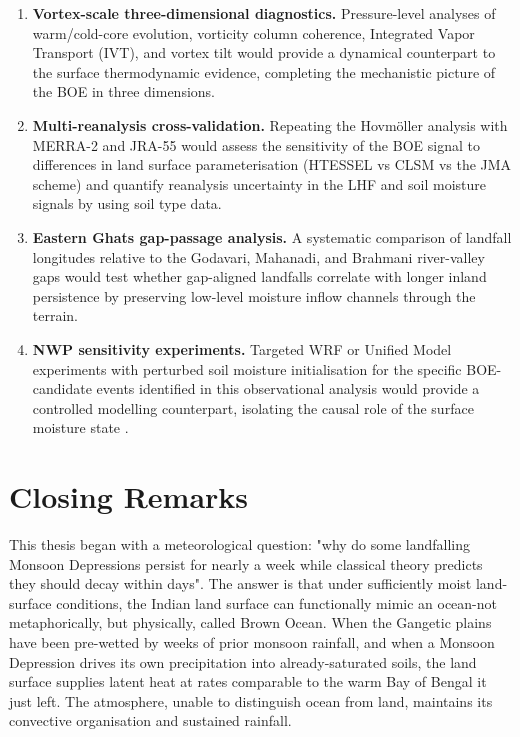 \begin{enumerate}
  \item \textbf{Vortex-scale three-dimensional diagnostics.}
    Pressure-level analyses of warm/cold-core evolution, vorticity
    column coherence, Integrated Vapor Transport (IVT), and vortex tilt
    would provide a dynamical counterpart to the surface thermodynamic evidence,
    completing the mechanistic picture of the BOE in three dimensions.
  \item \textbf{Multi-reanalysis cross-validation.} Repeating the
    Hovm\"{o}ller analysis with MERRA-2 and JRA-55 would
    assess the sensitivity of the BOE signal to differences in land
    surface parameterisation (HTESSEL vs CLSM vs the JMA scheme) and
    quantify reanalysis uncertainty in the LHF and soil moisture
    signals by using soil type data.
  \item \textbf{Eastern Ghats gap-passage analysis.} A systematic
    comparison of landfall longitudes relative to the Godavari,
    Mahanadi, and Brahmani river-valley gaps would test whether
    gap-aligned landfalls correlate with longer inland persistence by
    preserving low-level moisture inflow channels through the terrain.
  \item \textbf{NWP sensitivity experiments.} Targeted WRF or Unified
    Model experiments with perturbed soil moisture initialisation for
    the specific BOE-candidate events identified in this observational
    analysis would provide a controlled modelling counterpart,
    isolating the causal role of the surface moisture state
    \citep{hunt2017effect, osuri2020}.
\end{enumerate}

\section{Closing Remarks}
\label{sec:conclusions_closing}

This thesis began with a meteorological question: "why do some landfalling
Monsoon Depressions persist for nearly a week while classical theory predicts
they should decay within days". The answer is that under sufficiently
moist land-surface conditions, the Indian land surface can
functionally mimic an ocean-not metaphorically, but physically,
called Brown Ocean. When the Gangetic plains have been pre-wetted by
weeks of prior monsoon rainfall, and when a Monsoon Depression drives
its own precipitation into already-saturated soils, the land surface
supplies latent heat at rates comparable to the warm Bay of Bengal it
just left. The atmosphere, unable to distinguish ocean from land,
maintains its convective organisation and sustained rainfall.

